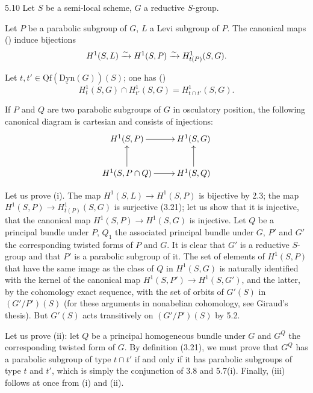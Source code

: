 \begin{corollary}{5.10}\label{XXVI.5.10}
Let $S$ be a semi-local scheme, $G$ a reductive $S$-group.
\begin{enumeratei}
\item Let $P$ be a parabolic subgroup of $G$, $L$ a Levi subgroup of $P$. The canonical maps () induce bijections
\[
 H^1(S,L)\xrightarrow{\sim} H^1(S,P)\xrightarrow{\sim} H^1_{t(P)}(S,G).
\]
\item Let $t,t'\in\underline{\mathrm{Of}}(\underline{\mathrm{Dyn}}(G))(S)$; one has ()
\[
 H^1_t(S,G)\cap H^1_{t'}(S,G)=H^1_{t\cap t'}(S,G).
\]
\item If $P$ and $Q$ are two parabolic subgroups of $G$ in osculatory position, the following canonical diagram is cartesian and consists of injections:
\[
\xymatrix{
 H^1(S,P)\ar[r]&H^1(S,G)\\
 H^1(S,P\cap Q)\ar[u]\ar[r]&H^1(S,Q)\ar[u].
}
\]
\end{enumeratei}
\end{corollary}
Let us prove (i). The map $H^1(S,L)\to H^1(S,P)$ is bijective by 2.3; the map $H^1(S,P)\to H^1_{t(P)}(S,G)$ is surjective (3.21); let us show that it is injective, \ie that the canonical map $H^1(S,P)\to H^1(S,G)$ is injective. Let $Q$ be a principal bundle under $P$, $Q_1$ the associated principal bundle under $G$, $P'$ and $G'$ the corresponding twisted forms of $P$ and $G$. It is clear that $G'$ is a reductive $S$-group and that $P'$ is a parabolic subgroup of it. The set of elements of $H^1(S,P)$ that have the same image as the class of $Q$ in $H^1(S,G)$ is naturally identified with the kernel of the canonical map $H^1(S,P')\to H^1(S,G')$, and the latter, by the cohomology exact sequence, with the set of orbits of $G'(S)$ in $(G'/P')(S)$ (for these arguments in nonabelian cohomology, see Giraud's thesis). But $G'(S)$ acts transitively on $(G'/P')(S)$ by 5.2.

Let us prove (ii): let $Q$ be a principal homogeneous bundle under $G$ and $G^Q$ the corresponding twisted form of $G$. By definition (3.21), we must prove that $G^Q$ has a parabolic subgroup of type $t\cap t'$ if and only if it has parabolic subgroups of type $t$ and $t'$, which is simply the conjunction of 3.8 and 5.7(i). Finally, (iii) follows at once from (i) and (ii).

